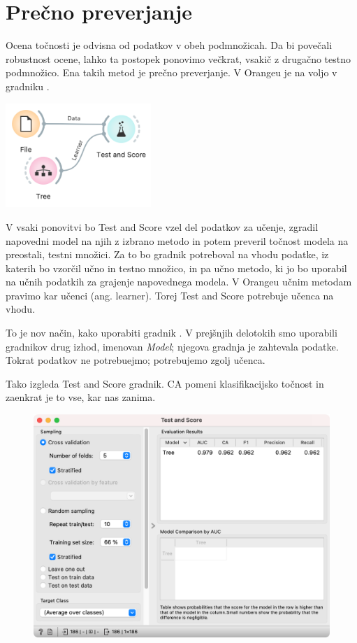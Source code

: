 \chapter{Prečno preverjanje} 
\label{ch:precno-preverjanje}

Ocena točnosti je odvisna od podatkov v obeh podmnožicah. Da bi povečali robustnost ocene, lahko ta postopek ponovimo večkrat, vsakič z drugačno testno podmnožico. Ena takih metod je prečno preverjanje. V Orangeu je na voljo v gradniku .

\begin{marginfigure}
    \centering
    \includegraphics[width=55mm]{workflow.png}
    \caption{$\;$}
    \label{fig:workflow1}
\end{marginfigure}

V vsaki ponovitvi bo Test and Score vzel del podatkov za učenje, zgradil napovedni model na njih z izbrano metodo in potem preveril točnost modela na preostali, testni množici. Za to bo gradnik potreboval na vhodu podatke, iz katerih bo vzorčil učno in testno množico, in pa učno metodo, ki jo bo uporabil na učnih podatkih za grajenje napovednega modela. V Orangeu učnim metodam pravimo kar učenci (ang. learner). Torej Test and Score potrebuje učenca na vhodu.

To je nov način, kako uporabiti gradnik . V prejšnjih delotokih smo uporabili gradnikov drug izhod, imenovan \textit{Model}; njegova gradnja je zahtevala podatke. Tokrat podatkov ne potrebuejmo; potrebujemo zgolj učenca.

Tako izgleda Test and Score gradnik. CA pomeni klasifikacijsko točnost in zaenkrat je to vse, kar nas zanima. 

\begin{figure}[h]
    \includegraphics[width=\linewidth]{testandscore.png}
    \caption{$\;$}
\end{figure}
